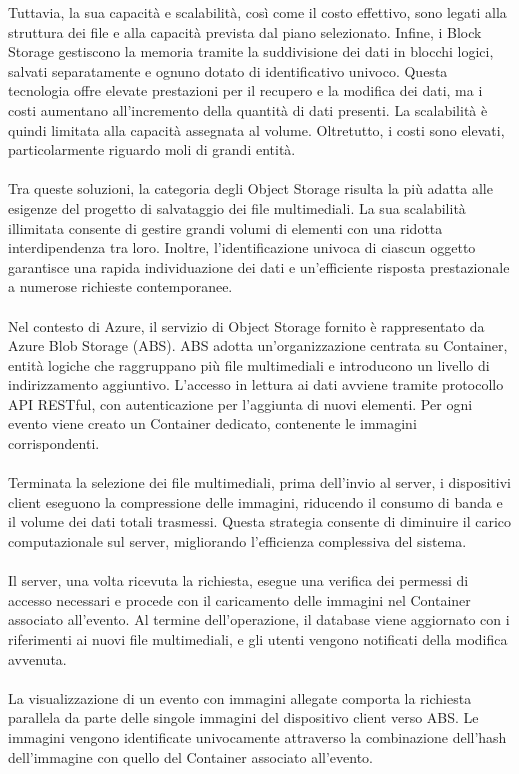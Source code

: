 Tuttavia, la sua capacità e scalabilità, così come il costo effettivo, sono legati alla struttura dei file e alla capacità prevista dal piano selezionato.
Infine, i Block Storage gestiscono la memoria tramite la suddivisione dei dati in blocchi logici, salvati separatamente e ognuno dotato di identificativo univoco. 
Questa tecnologia offre elevate prestazioni per il recupero e la modifica dei dati, ma i costi aumentano all'incremento della quantità di dati presenti. 
La scalabilità è quindi limitata alla capacità assegnata al volume. Oltretutto, i costi sono elevati, particolarmente riguardo moli di grandi entità.\\
\\
Tra queste soluzioni, la categoria degli Object Storage risulta la più adatta alle esigenze del progetto di salvataggio dei file multimediali. 
La sua scalabilità illimitata consente di gestire grandi volumi di elementi con una ridotta interdipendenza tra loro. 
Inoltre, l’identificazione univoca di ciascun oggetto garantisce una rapida individuazione dei dati e un’efficiente risposta prestazionale a numerose richieste contemporanee.\\
\\
Nel contesto di Azure, il servizio di Object Storage fornito è rappresentato da Azure Blob Storage (ABS). 
ABS adotta un’organizzazione centrata su Container, entità logiche che raggruppano più file multimediali e introducono un livello di indirizzamento aggiuntivo. 
L’accesso in lettura ai dati avviene tramite protocollo API RESTful, con autenticazione per l’aggiunta di nuovi elementi. 
Per ogni evento viene creato un Container dedicato, contenente le immagini corrispondenti.\\
\\
Terminata la selezione dei file multimediali, prima dell’invio al server, i dispositivi client eseguono la compressione delle immagini, 
riducendo il consumo di banda e il volume dei dati totali trasmessi. 
Questa strategia consente di diminuire il carico computazionale sul server, migliorando l’efficienza complessiva del sistema.\\
\\
Il server, una volta ricevuta la richiesta, esegue una verifica dei permessi di accesso necessari e procede con il caricamento delle immagini nel Container associato all’evento. 
Al termine dell’operazione, il database viene aggiornato con i riferimenti ai nuovi file multimediali, e gli utenti vengono notificati della modifica avvenuta.\\
\\
La visualizzazione di un evento con immagini allegate comporta la richiesta parallela da parte delle singole immagini del dispositivo client verso ABS. 
Le immagini vengono identificate univocamente attraverso la combinazione dell’hash dell’immagine con quello del Container associato all’evento.\\
\\

